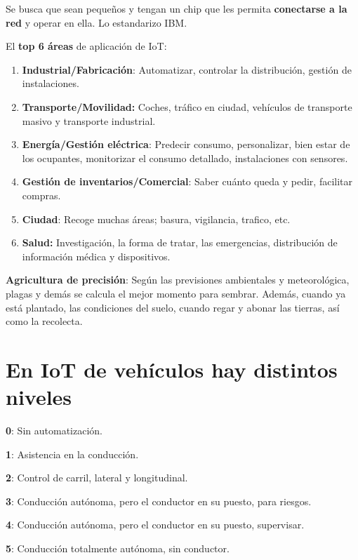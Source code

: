 \documentclass[12pt]{report} %
\begin{document}
Se busca que sean pequeños y tengan un chip que les permita
\textbf{conectarse a la red} y operar en ella. Lo estandarizo IBM.

El \textbf{top 6 áreas} de aplicación de IoT:

\begin{enumerate}
\def\labelenumi{\arabic{enumi}.}

\item
  \textbf{Industrial/Fabricación}: Automatizar, controlar la
  distribución, gestión de instalaciones.
\item
  \textbf{Transporte/Movilidad:} Coches, tráfico en ciudad, vehículos de
  transporte masivo y transporte industrial.
\item
  \textbf{Energía/Gestión eléctrica}: Predecir consumo, personalizar,
  bien estar de los ocupantes, monitorizar el consumo detallado,
  instalaciones con sensores.
\item
  \textbf{Gestión de inventarios/Comercial}: Saber cuánto queda y pedir,
  facilitar compras.
\item
  \textbf{Ciudad}: Recoge muchas áreas; basura, vigilancia, trafico,
  etc.
\item
  \textbf{Salud:} Investigación, la forma de tratar, las emergencias,
  distribución de información médica y dispositivos.
\end{enumerate}

\textbf{Agricultura de precisión}: Según las previsiones ambientales y
meteorológica, plagas y demás se calcula el mejor momento para sembrar.
Además, cuando ya está plantado, las condiciones del suelo, cuando regar
y abonar las tierras, así como la recolecta.

\newpage

\section{En IoT de vehículos hay distintos
niveles}

\textbf{0}: Sin automatización.

\textbf{1}: Asistencia en la conducción.

\textbf{2}: Control de carril, lateral y longitudinal.

\textbf{3}: Conducción autónoma, pero el conductor en su puesto, para
riesgos.

\textbf{4}: Conducción autónoma, pero el conductor en su puesto,
supervisar.

\textbf{5}: Conducción totalmente autónoma, sin conductor.
\end{document}
